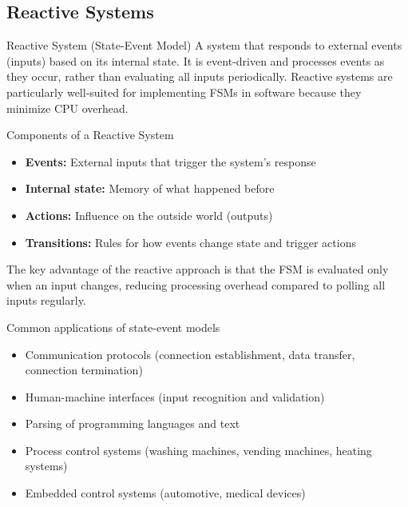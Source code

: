 \subsection{Reactive Systems}

\begin{definition}{Reactive System (State-Event Model)}
A system that responds to external events (inputs) based on its internal state. It is event-driven and processes events as they occur, rather than evaluating all inputs periodically. Reactive systems are particularly well-suited for implementing FSMs in software because they minimize CPU overhead.
\end{definition}

\begin{concept}{Components of a Reactive System}
\begin{itemize}
    \item \textbf{Events:} External inputs that trigger the system's response
    \item \textbf{Internal state:} Memory of what happened before
    \item \textbf{Actions:} Influence on the outside world (outputs)
    \item \textbf{Transitions:} Rules for how events change state and trigger actions
\end{itemize}

The key advantage of the reactive approach is that the FSM is evaluated only when an input changes, reducing processing overhead compared to polling all inputs regularly.
\end{concept}

\begin{example2}
{Common applications of state-event models}
\begin{itemize}
    \item Communication protocols (connection establishment, data transfer, connection termination)
    \item Human-machine interfaces (input recognition and validation)
    \item Parsing of programming languages and text
    \item Process control systems (washing machines, vending machines, heating systems)
    \item Embedded control systems (automotive, medical devices)
\end{itemize}
\end{example2}

\raggedcolumns
\columnbreak

